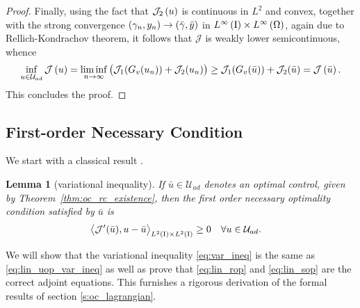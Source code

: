 \documentclass[final]{siamltex}
\newtheorem{lem}[theorem]{Lemma}
\begin{document}
\begin{proof}
Finally, using the fact that ${\mathcal{J}}_2\del{u}$ is continuous in $L^2$ and convex, together with the strong convergence 
$\del{\gamma_n, y_n} \rightarrow \del{{\bar{\gamma}}, {\bar{y}}}$ in $L^\infty\del{\text{\rm I}}\times L^\infty\del{\Omega} $, 
again due to Rellich-Kondrachov theorem, it follows that ${\mathcal{J}}$ is weakly lower semicontinuous, whence
	\begin{align*}
    		\inf_{u\in{{\mathcal{U}_{ad}}}} {\mathcal{J}}\del{u} 
			= \liminf_{n\to\infty} \del{{\mathcal{J}}_1(G_v(u_n)) + {\mathcal{J}}_2(u_n)}
			\ge {\mathcal{J}}_1(G_v({\bar{u}})) + {\mathcal{J}}_2({\bar{u}}) 
		      	= {\mathcal{J}}\del{\bar{u}}.
	\end{align*}
This concludes the proof.
\end{proof}

\subsection{First-order Necessary Condition}
\label{s:oc_rc_first}
We start with a classical result \cite{FTroltzsch_2010a}. 
\begin{lem}[variational inequality] 
If ${\bar{u}} \in {{\mathcal{U}_{ad}}}$ denotes an optimal control, given by Theorem~\ref{thm:oc_rc_existence}, then the 
first order necessary optimality condition satisfied by ${\bar{u}}$ is
\begin{align}  \label{eq:var_ineq}
       {{\mathop{{\left\langle {{\mathcal{J}'({\bar{u}}), u - {\bar{u}}}} \right\rangle}}}_{{{L^2\del{{{\text{\rm I}}}}}}\times{{L^2\del{{{\text{\rm I}}}}}}}}  &\ge 0  \quad  \forall u \in {{\mathcal{U}_{ad}}} .
\end{align}
\end{lem}
	We will show that the variational inequality \eqref{eq:var_ineq} is the same as 
\eqref{eq:lin_uop_var_ineq} as well as prove that \eqref{eq:lin_rop} and \eqref{eq:lin_sop}
are the correct adjoint equations. This furnishes a rigorous
derivation of the formal results of section \ref{s:oc_lagrangian}.
\end{document}
